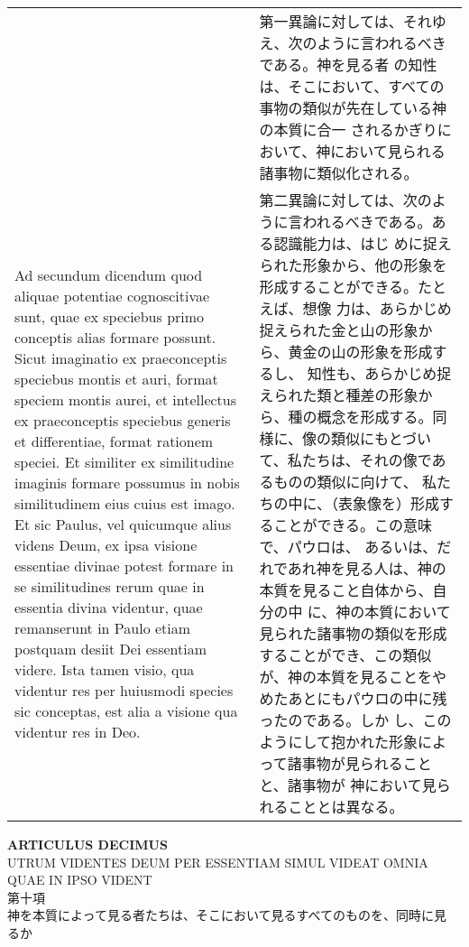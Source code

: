 \documentclass[10pt]{jsarticle} %
\begin{document}
\begin{longtable}{p{21em}p{21em}}
&

第一異論に対しては、それゆえ、次のように言われるべきである。神を見る者
の知性は、そこにおいて、すべての事物の類似が先在している神の本質に合一
されるかぎりにおいて、神において見られる諸事物に類似化される。

\\


{\sc  Ad secundum dicendum} quod aliquae potentiae cognoscitivae
 sunt, quae ex speciebus primo conceptis alias formare possunt. Sicut
 imaginatio ex praeconceptis speciebus montis et auri, format speciem
 montis aurei, et intellectus ex praeconceptis speciebus generis et
 differentiae, format rationem speciei. Et similiter ex similitudine
 imaginis formare possumus in nobis similitudinem eius cuius est
 imago. Et sic Paulus, vel quicumque alius videns Deum, ex ipsa visione
 essentiae divinae potest formare in se similitudines rerum quae in
 essentia divina videntur, quae remanserunt in Paulo etiam postquam
 desiit Dei essentiam videre. Ista tamen visio, qua videntur res per
 huiusmodi species sic conceptas, est alia a visione qua videntur res in
 Deo.


&

第二異論に対しては、次のように言われるべきである。ある認識能力は、はじ
めに捉えられた形象から、他の形象を形成することができる。たとえば、想像
力は、あらかじめ捉えられた金と山の形象から、黄金の山の形象を形成するし、
知性も、あらかじめ捉えられた類と種差の形象から、種の概念を形成する。同
様に、像の類似にもとづいて、私たちは、それの像であるものの類似に向けて、
私たちの中に、（表象像を）形成することができる。この意味で、パウロは、
あるいは、だれであれ神を見る人は、神の本質を見ること自体から、自分の中
に、神の本質において見られた諸事物の類似を形成することができ、この類似
が、神の本質を見ることをやめたあとにもパウロの中に残ったのである。しか
し、このようにして抱かれた形象によって諸事物が見られることと、諸事物が
神において見られることとは異なる。



\end{longtable}


\newpage
{}


\begin{center}
{\Large {\bf ARTICULUS DECIMUS}}\\
{\large UTRUM VIDENTES DEUM PER ESSENTIAM SIMUL VIDEAT OMNIA\\QUAE IN
 IPSO VIDENT\\
第十項\\
神を本質によって見る者たちは、そこにおいて見るすべてのものを、同時に見
 るか}
\end{center}
\end{document}
